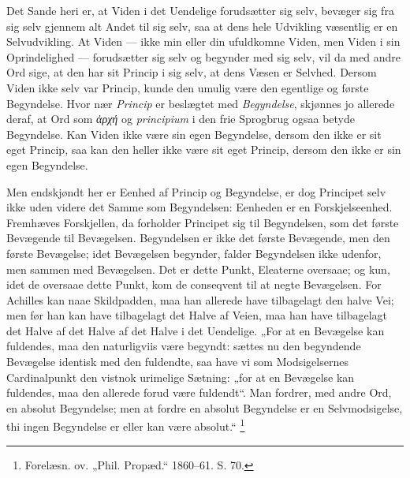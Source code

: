\documentclass[11pt]{book}
\newcommand{\opage}[1]{\marginnote{\footnotesize\textit{[#1]}}}
\begin{document}
Det Sande heri er, at Viden i det Uendelige forudsætter sig selv,
bevæger sig fra sig selv gjennem alt Andet til sig selv, saa at dens
hele Udvikling væsentlig er en Selvudvikling. At Viden --- ikke min
eller din ufuldkomne Viden, men Viden i sin Oprindelighed ---
forudsætter sig selv og begynder med sig selv, vil da med andre Ord
sige, at den har sit Princip i sig selv, at dens Væsen er Selvhed.
Dersom Viden ikke selv var Princip, kunde den umulig være den egentlige
og første Begyndelse. Hvor nær \emph{Princip} er beslægtet med
\emph{Begyndelse}, skjønnes jo allerede deraf, at Ord som
\textit{ἀρχή} og \textit{principium} i den frie Sprogbrug ogsaa betyde
Begyndelse. Kan Viden ikke være sin egen Begyndelse, dersom den ikke
er
\opage{7} \setcounter{footnote}{0}%
sit eget Princip, saa kan den heller ikke være sit eget Princip, dersom
den ikke er sin egen Begyndelse.

Men endskjøndt her er Eenhed af Princip og Begyndelse, er dog Principet
selv ikke uden videre det Samme som Begyndelsen: Eenheden er en
Forskjelseenhed. Fremhæves Forskjellen, da forholder Principet sig til
Begyndelsen, som det første Bevægende til Bevægelsen. Begyndelsen er
ikke det første Bevægende, men den første Bevægelse; idet Bevægelsen
begynder, falder Begyndelsen ikke udenfor, men sammen med Bevægelsen.
Det er dette Punkt, Eleaterne oversaae; og kun, idet de oversaae dette
Punkt, kom de conseqvent til at negte Bevægelsen. For Achilles kan
naae Skildpadden, maa han allerede have tilbagelagt den halve Vei; men
før han kan have tilbagelagt det Halve af Veien, maa han have
tilbagelagt det Halve af det Halve af det Halve i det Uendelige. „For
at en Bevægelse kan fuldendes, maa den naturligviis være begyndt:
sættes nu den begyndende Bevægelse identisk med den fuldendte, saa have
vi som Modsigelsernes Cardinalpunkt den vistnok urimelige Sætning: „for
at en Bevægelse kan fuldendes, maa den allerede forud være fuldendt“.
Man fordrer, med andre Ord, en absolut Begyndelse; men at fordre en
absolut Begyndelse er en Selvmodsigelse, thi ingen Begyndelse er eller
kan være absolut.“%
\footnote{Forelæsn. ov. „Phil. Propæd.“ 1860--61. S. 70.}
\end{document}

